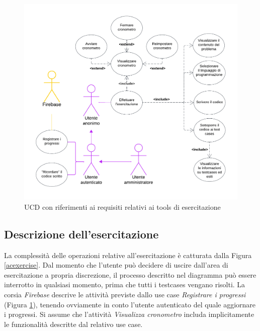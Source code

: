 \documentclass[11pt, a4paper]{article}
\theoremstyle{definition} %
\begin{document}
\begin{figure}[H]
\centering
\hspace*{-2cm}
\includegraphics[scale = 0.95]{materiale/ucdiagrams/ucesercitazione.pdf}
\caption{UCD con riferimenti ai requisiti relativi ai tools di esercitazione}
\label{esercitaz}
\end{figure}

\newpage
\subsection*{Descrizione dell'esercitazione}
La complessità delle operazioni relative all'esercitazione è
catturata dalla Figura \ref{acexercise}.
Dal momento che l'utente può decidere di uscire dall'area di esercitazione
a propria discrezione, il processo descritto nel diagramma
può essere interrotto in qualsiasi momento, prima che tutti i
testcases vengano risolti.
La corsia \textit{Firebase} descrive le
attività previste dallo use case \textit{Registrare i progressi}
(Figura \ref{esercitaz}), tenendo ovviamente in conto l'utente
autenticato del quale aggiornare i progressi.
Si assume che l'attività \textit{Visualizza cronometro} includa
implicitamente le funzionalità descritte dal relativo use case.
\end{document}
